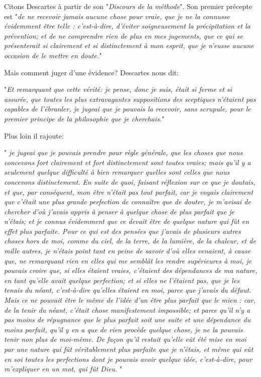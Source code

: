 \documentclass[a4paper, 12pt, twoside]{book}
\begin{document}
 

 
 Citons Descartes à partir de son "\textit{Discours de la méthode}". Son premier précepte est "\textit{de ne recevoir jamais aucune chose pour vraie, que je ne la connusse évidemment être telle : c'est-à-dire, d'éviter soigneusement la précipitation et la prévention; et de ne comprendre rien de plus en mes jugements, que ce qui se présenterait si clairement et si distinctement à mon esprit, que je n'eusse aucune occasion de le mettre en doute.}" 
 
Mais comment juger d'une évidence? Descartes nous dit:\


"\textit{Et remarquant que cette vérité: je pense, donc je suis, était si ferme et si assurée, que toutes les plus extravagantes suppositions des sceptiques n'étaient pas capables de l'ébranler, je jugeai que je pouvais la recevoir, sans scrupule, pour le premier principe de la philosophie que je cherchais.}"\

Plus loin il rajoute:\

 
 
" \textit{je jugeai que je pouvais prendre pour règle générale, que les choses que nous concevons fort clairement et fort distinctement sont toutes vraies; mais qu'il y a seulement quelque difficulté à bien remarquer quelles sont celles que nous concevons distinctement. En suite de quoi, faisant réflexion sur ce que je doutais, et que, par conséquent, mon être n'était pas tout parfait, car je voyais clairement que c'était une plus grande perfection de connaître que de douter, je m'avisai de chercher d'où j'avais appris à penser à quelque chose de plus parfait que je n'étais; et je connus évidemment que ce devait être de quelque nature qui fût en effet plus parfaite. Pour ce qui est des pensées que j'avais de plusieurs autres choses hors de moi, comme du ciel, de la terre, de la lumière, de la chaleur, et de mille autres, je n'étais point tant en peine de savoir d'où elles venaient, à cause que, ne remarquant rien en elles qui me semblât les rendre supérieures à moi, je pouvais croire que, si elles étaient vraies, c'étaient des dépendances de ma nature, en tant qu'elle avait quelque perfection; et si elles ne l'étaient pas, que je les tenais du néant, c'est-à-dire qu'elles étaient en moi, parce que j'avais du défaut. Mais ce ne pouvait être le même de l'idée d'un être plus parfait que le mien : car, de la tenir du néant, c'était chose manifestement impossible; et parce qu'il n'y a pas moins de répugnance que le plus parfait soit une suite et une dépendance du moins parfait, qu'il y en a que de rien procède quelque chose, je 
ne la pouvais tenir non plus de moi-même. De façon qu'il restait qu'elle eût été mise en moi par une nature qui fût véritablement plus parfaite que je n'étais, et même qui eût en soi toutes les perfections dont je pouvais avoir quelque idée, c'est-à-dire, pour m'expliquer en un mot, qui fût Dieu. }"\
\end{document}
